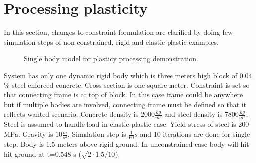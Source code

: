 \section{Processing plasticity}

In this section, changes to constraint formulation are clarified by doing few simulation steps of non constrained, rigid and
elastic-plastic examples.

\begin{figure}[htb!]
\centering
{}
\caption{Single body model for plasticy processing demonstration.}
\label{fig:tensionModel}
\end{figure}

System has only one dynamic rigid body which is three meters high block of 0.04 \% steel enforced concrete. 
Cross section is one square meter.
Constraint is set so that connecting frame is at top of block. 
In this case frame could be anywhere but if multiple bodies are involved, connecting frame must be defined
so that it reflects wanted scenario.
Concrete density is $2000 \frac{kg}{m^3}$ and steel density is $7800 \frac{kg}{m^3}$. 
Steel is assumed to handle load in elastic-plastic case. Yield stress of steel is 200 MPa.
Gravity is $10 \frac{m}{s^2}$. Simulation step is $\frac{1}{60} s$ and 10 
iterations are done for single step.
Body is 1.5 meters above rigid ground. In unconstrained case body will hit hit ground at t=0.548 s 
($\sqrt{2 \cdot 1.5 / 10}$).

